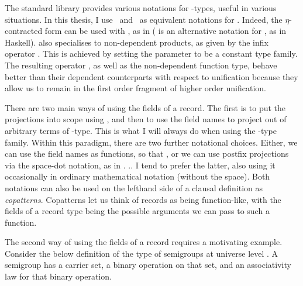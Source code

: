The standard library provides various notations for
\AgdaRecord{$\Upsigma$}-types, useful in various situations.
In this thesis, I use \ and
\ as equivalent notations for
\AgdaRecord{$\Upsigma$}\AgdaSpace{}\AgdaSpace{}.
Indeed, the $\eta$-contracted form can be used with \AgdaFunction{$\exists$}, as
in \AgdaFunction{$\exists$}\AgdaSpace{} (\AgdaSymbol{\textbackslash}
is an alternative notation for \AgdaSymbol{$\uplambda$}, as in Haskell).
\AgdaRecord{$\Upsigma$} also specialises to non-dependent products, as given by
the infix operator \AgdaFunction{\_$\times$\_}.
This is achieved by setting the parameter  to be a constant type
family.
The resulting operator \AgdaFunction{\_$\times$\_}, as well as the non-dependent
function type, behave better than their dependent counterparts with respect to
unification because they allow us to remain in the first order fragment of
higher order unification.

There are two main ways of using the fields of a record.
The first is to put the projections into scope using
\AgdaSpace{}\AgdaRecord{$\Upsigma$}, and then to use the field
names to project out of arbitrary terms of \AgdaRecord{$\Upsigma$}-type.
This is what I will always do when using the \AgdaRecord{$\Upsigma$}-type
family.
Within this paradigm, there are two further notational choices.
Either, we can use the field names as functions, so that
\AgdaSpace{}\AgdaSymbol{=}\AgdaSpace{}%
\AgdaSpace{}\AgdaSpace{}\AgdaOperator{\AgdaInductiveConstructor,}%
\AgdaSpace{}\AgdaSpace{},
or we can use postfix projections via the space-dot notation, as in
\AgdaSpace{}\AgdaSymbol{=}\AgdaSpace{}%
\AgdaSpace{}\AgdaSymbol.\AgdaSpace{}%
\AgdaOperator{\AgdaInductiveConstructor,}\AgdaSpace{}%
\AgdaSpace{}\AgdaSymbol..
I tend to prefer the latter, also using it occasionally in ordinary mathematical
notation (without the space).
Both notations can also be used on the lefthand side of a clausal definition as
\emph{copatterns}.
Copatterns let us think of records as being function-like, with the fields of a
record type being the possible arguments we can pass to such a function.

The second way of using the fields of a record requires a motivating example.
Consider the below definition of the type of semigroups at universe level
\AgdaBound{$\ell$}.
A semigroup has a carrier set, a binary operation on that set, and an
associativity law for that binary operation.

